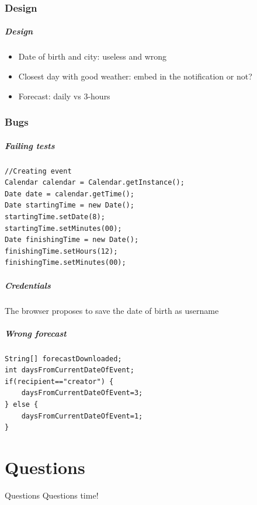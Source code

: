 \documentclass[professionalfonts]{beamer}
\begin{document}
\section{Design}
\begin{frame}
\frametitle{Design}
\begin{itemize}
\item Date of birth and city: useless and wrong
\item Closest day with good weather: embed in the notification or not?
\item Forecast: daily vs 3-hours
\end{itemize}
\end{frame}

\section{Bugs}

\begin{frame}[fragile]
\frametitle{Failing tests}

\begin{verbatim}
//Creating event
Calendar calendar = Calendar.getInstance();
Date date = calendar.getTime();
Date startingTime = new Date();
startingTime.setDate(8);
startingTime.setMinutes(00);
Date finishingTime = new Date();
finishingTime.setHours(12);
finishingTime.setMinutes(00);
\end{verbatim}
\end{frame}

\begin{frame}
\frametitle{Credentials}
The browser proposes to save the date of birth as username
\end{frame}

\begin{frame}[fragile]
\frametitle{Wrong forecast}
\begin{verbatim}
String[] forecastDownloaded;
int daysFromCurrentDateOfEvent;
if(recipient=="creator") {
    daysFromCurrentDateOfEvent=3;
} else {
    daysFromCurrentDateOfEvent=1; 
}
\end{verbatim}
\end{frame}

\part{Questions}
\label{part:questions}
\begin{frame}{Questions}
\centering\alert{Questions time!}
\end{frame}
\end{document}
